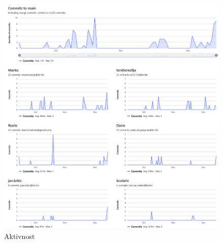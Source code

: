 		\begin{figure}[H]
			\includegraphics[scale=0.4]{slike/mainAktivnost.png} %
			\centering
			\caption{Aktivnost}
			\label{fig:promjene}
		\end{figure}

		
	